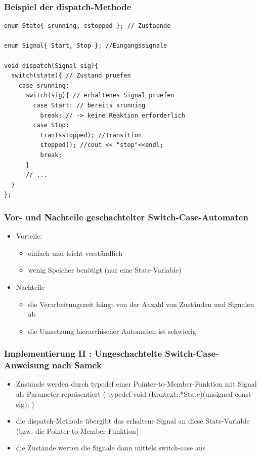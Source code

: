 \documentclass{beamer}
\begin{document}
\begin{frame}[fragile]
  \frametitle{Beispiel der dispatch-Methode}
  \begin{lstlisting}
enum State{ srunning, sstopped }; // Zustaende

enum Signal{ Start, Stop }; //Eingangssignale

void dispatch(Signal sig){
  switch(state){ // Zustand pruefen
    case srunning:
      switch(sig){ // erhaltenes Signal pruefen
        case Start: // bereits srunning  
          break; // -> keine Reaktion erforderlich
        case Stop:
          tran(sstopped); //Transition
          stopped(); //cout << "stop"<<endl;
          break;
      }
      // ...
  }  
};
  \end{lstlisting}
\end{frame}

\begin{frame}
  \frametitle{Vor- und Nachteile geschachtelter Switch-Case-Automaten}
  \begin{itemize}
    \item Vorteile:
    \begin{itemize}
      \item einfach und leicht verst\"andlich
      \item wenig Speicher ben\"otigt (nur eine State-Variable)
    \end{itemize}
    \item Nachteile
    \begin{itemize}
      \item die Verarbeitungszeit h\"angt von der Anzahl von Zust\"anden und Signalen ab
      \item die Umsetzung hierarchischer Automaten ist schwierig 
    \end{itemize}
  \end{itemize}
\end{frame}

\begin{frame}
	\frametitle{Implementierung II : Ungeschachtelte Switch-Case-Anweisung nach Samek}
	\begin{itemize}
		\item Zust\"ande werden durch typedef einer Pointer-to-Member-Funktion mit Signal als Parameter repr\"asentiert (  typedef void (Kontext::*State)(unsigned const sig);  )
		\item die dispatch-Methode \"ubergibt das erhaltene Signal an diese State-Variable (bzw. die Pointer-to-Member-Funktion) 
		\item die Zust\"ande werten die Signale dann mittels switch-case aus
	\end{itemize}
\end{frame}
\end{document}
